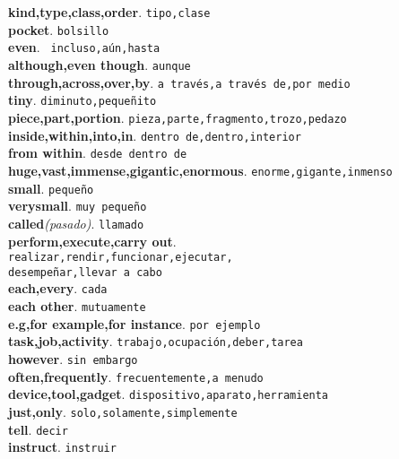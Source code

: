 \documentclass[twocolumn]{article}
\begin{document}
	\textsf{\textbf{kind,type,class,order}}. \texttt{tipo,clase}\\
	\textsf{\textbf{pocket}}. \texttt{bolsillo}\\
	\textsf{\textbf{even}}. \texttt{ incluso,a\'un,hasta}\\
	\textsf{\textbf{although,even though}}. \texttt{aunque}\\ 
	\textsf{\textbf{through,across,over,by}}. \texttt{a trav\'es,a trav\'es de,por medio}\\  
	\textsf{\textbf{tiny}}. \texttt{diminuto,peque\~nito}\\ 
	\textsf{\textbf{piece,part,portion}}. \texttt{pieza,parte,fragmento,trozo,pedazo}\\
	\textsf{\textbf{inside,within,into,in}}. \texttt{dentro de,dentro,interior}\\
	\textsf{\textbf{from within}}. \texttt{desde dentro de}\\
	\textsf{\textbf{huge,vast,immense,gigantic,enormous}}. \texttt{enorme,gigante,inmenso}\\
	\textsf{\textbf{small}}. \texttt{peque\~no}\\
	\textsf{\textbf{verysmall}}. \texttt{muy peque\~no}\\
	\textsf{\textbf{called}{\scriptsize \textit{(pasado)}}}. \texttt{llamado}\\
	\textsf{\textbf{perform,execute,carry out}}.\\\texttt{realizar,rendir,funcionar,ejecutar,\\desempe\~nar,llevar a cabo}\\
	\textsf{\textbf{each,every}}. \texttt{cada}\\
	\textsf{\textbf{each other}}. \texttt{mutuamente}\\
	\textsf{\textbf{e.g,for example,for instance}}. \texttt{por ejemplo}\\
	\textsf{\textbf{task,job,activity}}. \texttt{trabajo,ocupaci\'on,deber,tarea}\\
	\textsf{\textbf{however}}. \texttt{sin embargo}\\
	\textsf{\textbf{often,frequently}}. \texttt{frecuentemente,a menudo}\\
	\textsf{\textbf{device,tool,gadget}}. \texttt{dispositivo,aparato,herramienta}\\
	\textsf{\textbf{just,only}}. \texttt{solo,solamente,simplemente}\\
	\textsf{\textbf{tell}}. \texttt{decir}\\
	\textsf{\textbf{instruct}}. \texttt{instruir}\\
\end{document}

